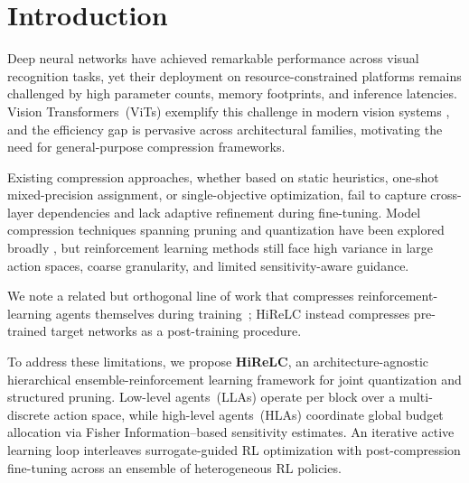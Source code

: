 \documentclass[preprint,12pt,authoryear]{elsarticle}
\begin{document}

\section{Introduction}
Deep neural networks have achieved remarkable performance across visual recognition 
tasks, yet their deployment on resource-constrained platforms remains challenged by 
high parameter counts, memory footprints, and inference latencies. Vision 
Transformers~(ViTs) exemplify this challenge in modern vision systems 
\citep{dosovitskiy2021,islam2022visiontransformer}, and the efficiency gap is pervasive 
across architectural families, motivating the need for general-purpose compression 
frameworks.

Existing compression approaches, whether based on static heuristics, one-shot 
mixed-precision assignment, or single-objective optimization, fail to capture 
cross-layer dependencies and lack adaptive refinement during fine-tuning. Model 
compression techniques spanning pruning and quantization have been explored broadly 
\citep{he2018amc,wang2019haq,bondarenko-2021-transformer-quantization}, but reinforcement 
learning methods still face high variance in large action spaces, coarse granularity, 
and limited sensitivity-aware guidance.

We note a related but orthogonal line of work that compresses reinforcement-learning
agents themselves during training~\citep{graesser2022state,obandoceron2024pruned,vincent2025eaudeq};
HiReLC instead compresses pre-trained target networks as a post-training procedure.

To address these limitations, we propose \textbf{HiReLC}, an architecture-agnostic 
hierarchical ensemble-reinforcement learning framework for joint 
quantization and structured pruning. Low-level agents~(LLAs) operate per block over 
a multi-discrete action space, while high-level agents~(HLAs) coordinate global budget 
allocation via Fisher Information--based sensitivity estimates. An iterative active 
learning loop interleaves surrogate-guided RL optimization with post-compression
fine-tuning across an ensemble of heterogeneous RL policies.
\end{document}
